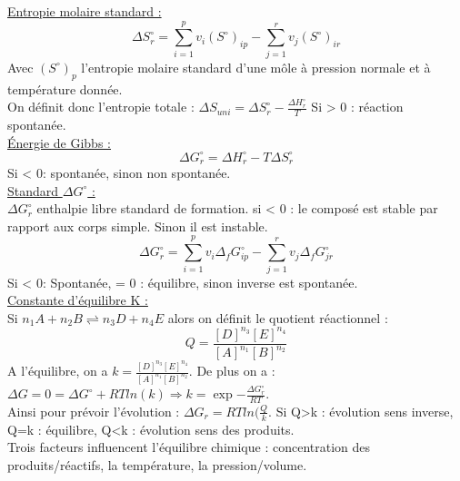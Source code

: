 \documentclass[../main.tex]{subfiles}
\begin{document}
\quad \underline{Entropie molaire standard :}\\
\begin{equation}
    \Delta S_r^{\circ} = \sum_{i=1}^p v_i (S^{\circ})_{ip} - \sum_{j=1}^r v_j (S^{\circ})_{ir}
\end{equation}
Avec $(S^{\circ})_{p}$ l'entropie molaire standard d'une môle à pression normale et à température donnée.\\


On définit donc l'entropie totale : $\Delta S_{uni} = \Delta S_r^{\circ} - \frac{\Delta H_r^{\circ}}{T}$ Si > 0 : réaction spontanée.\\

\quad \underline{Énergie de Gibbs :}\\
\begin{equation}
    \Delta G_r ^{\circ} = \Delta H_r^{\circ} - T \Delta S_r ^{\circ}
\end{equation}
Si < 0: spontanée, sinon non spontanée.\\

\quad \underline{Standard $\Delta G^{\circ}$ :}\\
$\Delta G_r ^{\circ}$ enthalpie libre standard de formation. si < 0 : le composé est stable par rapport aux corps simple. Sinon il est instable. \\
\begin{equation}
        \Delta G_r^{\circ} = \sum_{i=1}^p v_i \Delta_f G_{ip} ^{\circ} - \sum_{j=1}^r v_j \Delta_f G_{jr} ^{\circ}
\end{equation}
Si < 0: Spontanée, = 0 : équilibre, sinon inverse est spontanée.\\

\quad \underline{Constante d'équilibre K :}\\
Si $n_1 A + n_2 B \rightleftharpoons n_3 D + n_4 E$ alors on définit le quotient réactionnel : \\
\begin{equation}
    Q = \frac{[D]^{n_3} [E]^{n_4}}{[A]^{n_1} [B]^{n_2}}
\end{equation}
A l'équilibre, on a $k = \frac{[D]^{n_3} [E]^{n_4}}{[A]^{n_1} [B]^{n_2}}$. De plus on a : $\Delta G = 0 = \Delta G^{\circ} + RTln(k) \Rightarrow k = \exp{-\frac{\Delta G_r^{\circ}}{RT}}$. \\
Ainsi pour prévoir l'évolution : $\Delta G_r = RT ln(\frac{Q}{k}$. Si Q>k : évolution sens inverse, Q=k : équilibre, Q<k : évolution sens des produits.\\

Trois facteurs influencent l'équilibre chimique : concentration des produits/réactifs, la température, la pression/volume.\\
\end{document}
